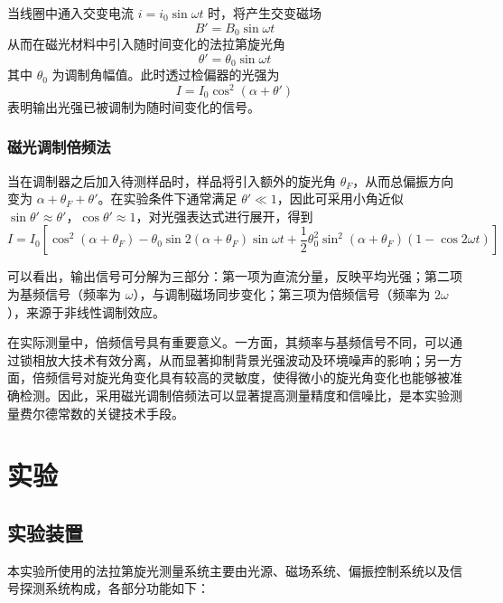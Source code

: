 \documentclass[a4paper, 1.5lines]{ctexart}
\begin{document}
当线圈中通入交变电流 $i = i_0 \sin \omega t$ 时，将产生交变磁场
\begin{equation}
    B' = B_0 \sin \omega t
\end{equation}
从而在磁光材料中引入随时间变化的法拉第旋光角
\begin{equation}
    \theta' = \theta_0 \sin \omega t
\end{equation}
其中 $\theta_0$ 为调制角幅值。此时透过检偏器的光强为
\begin{equation}
    I = I_0 \cos^2(\alpha + \theta')
\end{equation}
表明输出光强已被调制为随时间变化的信号。

\subsubsection{磁光调制倍频法}

当在调制器之后加入待测样品时，样品将引入额外的旋光角 $\theta_F$，从而总偏振方向变为 $\alpha + \theta_F + \theta'$。在实验条件下通常满足 $\theta' \ll 1$，因此可采用小角近似 $\sin \theta' \approx \theta'$，$\cos \theta' \approx 1$，对光强表达式进行展开，得到
\begin{equation}
    I = I_0 \left[ \cos^2(\alpha + \theta_F)
    - \theta_0 \sin 2(\alpha + \theta_F) \sin \omega t
    + \frac{1}{2} \theta_0^2 \sin^2(\alpha + \theta_F)(1 - \cos 2\omega t)
    \right]
\end{equation}

可以看出，输出信号可分解为三部分：第一项为直流分量，反映平均光强；第二项为基频信号（频率为 $\omega$），与调制磁场同步变化；第三项为倍频信号（频率为 $2\omega$），来源于非线性调制效应。

在实际测量中，倍频信号具有重要意义。一方面，其频率与基频信号不同，可以通过锁相放大技术有效分离，从而显著抑制背景光强波动及环境噪声的影响；另一方面，倍频信号对旋光角变化具有较高的灵敏度，使得微小的旋光角变化也能够被准确检测。因此，采用磁光调制倍频法可以显著提高测量精度和信噪比，是本实验测量费尔德常数的关键技术手段。
    \section{实验}

\subsection{实验装置}

本实验所使用的法拉第旋光测量系统主要由光源、磁场系统、偏振控制系统以及信号探测系统构成，各部分功能如下：
\end{document}
